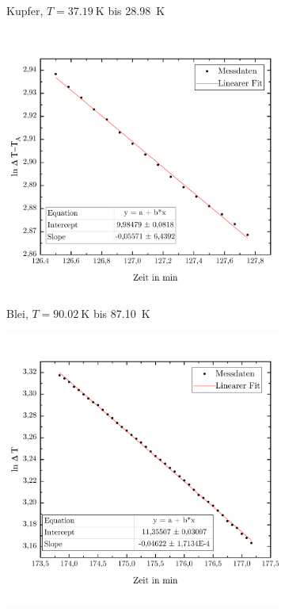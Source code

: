 \documentclass[parskip=half, a4paper,twoside,final]{article}
\begin{document}
\begin{figure}[ht!]
\begin{subfigure}[b!]{0.45\textwidth}
    \caption{Kupfer, $T=\SI{37,19}{\kelvin}$ bis \SI{28,98}{\kelvin}}
  \end{subfigure}
  \begin{subfigure}[b!]{0.45\textwidth}
    \includegraphics[width=\textwidth]{Bilder/90_02__87_10_lnDetlaT_TA}
    \caption{Blei, $T=\SI{90,02}{\kelvin}$ bis \SI{87,10}{\kelvin}}
  \end{subfigure}
  \begin{subfigure}[b!]{0.45\textwidth}
    \includegraphics[width=\textwidth]{Bilder/41_71__37_06_lnT.pdf}

\end{subfigure}
\end{figure}
\end{document}
